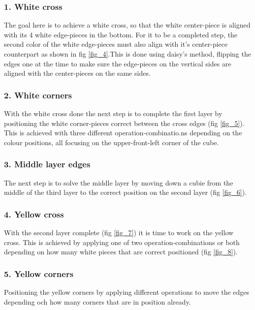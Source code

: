 \documentclass[a4paper,11pt]{kth-mag}
\begin{document}
\subsubsection{1. White cross}
The goal here is to achieve a white cross, so that the white center-piece is aligned with its 4 white edge-pieces in the bottom. For it to be a completed step, the second color of the white edge-pieces must also align with it’s center-piece counterpart as shown in fig \ref{fig_4}.This is done using daisy's method, flipping the edges one at the time to make sure the edge-pieces on the vertical sides are aligned with the center-pieces on the same sides.
\subsubsection{2. White corners}
With the white cross done the next step is to complete the first layer by positioning the white corner-pieces correct between the cross edges (fig \ref{fig_5}). This is achieved with three different operation-combinatio\cite{Shellie}.ns depending on the colour positions, all focusing on the upper-front-left corner of the cube.
\subsubsection{3. Middle layer edges}
The next step is to solve the middle layer by moving down a cubie from the middle of the third layer to the correct position on the second layer (fig \ref{fig_6}). 
\subsubsection{4. Yellow cross}
With the second layer complete (fig \ref{fig_7}) it is time to work on the yellow cross. This is achieved by applying one of two operation-combinations or both depending on how many white pieces that are correct positioned (fig \ref{fig_8}).  
\subsubsection{5. Yellow corners}
Positioning the yellow corners by applying different operations to move the edges depending och how many corners that are in position already. 
\end{document}
